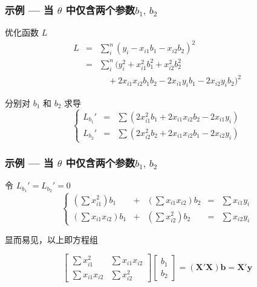 \documentclass[serif,aspectratio=169]{beamer}
\begin{document}
\begin{frame}
  \frametitle{示例 — 当 $\theta$ 中仅含两个参数$b_1,\,b_2$}
  \begin{block}{优化函数 $L$}
    $$
    \begin{array}{ccl}
      L & = & \sum_i^n(y_i-x_{i1}b_1-x_{i2}b_2)^2\\
      & = & \sum_i^n(y_i^2 + x_{i1}^2b_1^2 + x_{i2}^2b_2^2\\
      &   & \quad + 2x_{i1}x_{i2}b_1b_2 - 2x_{i1}y_ib_1 - 2x_{i2}y_ib_2)^2
    \end{array}
    $$
    
  \end{block}
  \pause
  \begin{block}{分别对 $b_1$ 和 $b_2$ 求导}
    $$
    \left\{\begin{array}{rcl}
    L_{b_1}' & = & \sum(2x_{i1}^2b_1+2x_{i1}x_{i2}b_2-2x_{i1}y_i)\\
    L_{b_2}' & = & \sum(2x_{i2}^2b_2+2x_{i1}x_{i2}b_1-2x_{i2}y_i)
    \end{array}\right.
    $$
  \end{block}
\end{frame}


\begin{frame}
  \frametitle{示例 — 当 $\theta$ 中仅含两个参数$b_1,\,b_2$}
  \begin{block}{令 $L_{b_1}' = L_{b_2}' = 0$}
    $$
    \left\{\begin{array}{rcrcl}
    (\sum x_{i1}^2)b_1 &+& (\sum x_{i1}x_{i2}) b_2 &=& \sum x_{i1}y_i\\
    (\sum x_{i1}x_{i2})b_1 &+& (\sum x_{i2}^2)b_2 &=& \sum x_{i2}y_i
    \end{array}\right.
    $$
  \end{block}
  \pause
  \begin{block}{显而易见，以上即方程组}
    
    $$
    \left[\begin{array}{ll}
        \sum x_{i1}^2 & \sum x_{i1}x_{i2}\\
        \sum x_{i1}x_{i2} & \sum x_{i2}^2
      \end{array}\right]
    \left[\begin{array}{c}
        b_1\\
        b_2
      \end{array}\right] = (\mathbf{X'X})\mathbf{b} = \mathbf{X'y}
    $$
    
  \end{block}
\end{frame}
\end{document}
